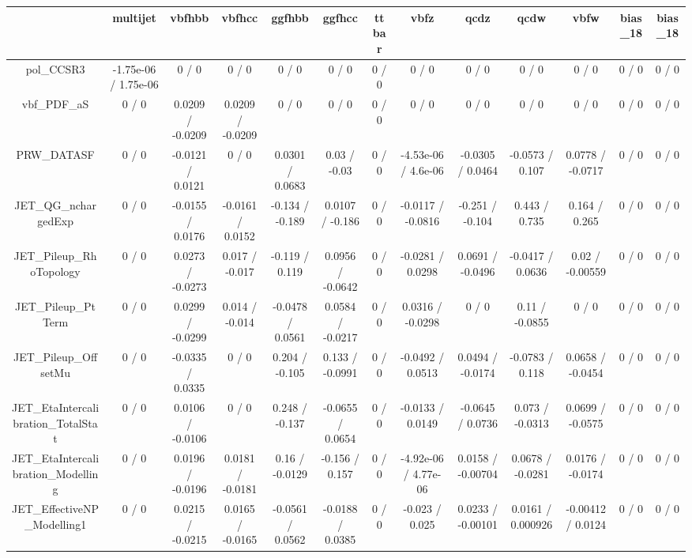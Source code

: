 \documentclass[10pt]{article}
\begin{document}
\begin{table}[htbp]
\begin{center}
\begin{tabular}{|c|c|c|c|c|c|c|c|c|c|c|c|c|}
\hline 
      & multijet      & vbfhbb      & vbfhcc      & ggfhbb      & ggfhcc      & ttbar      & vbfz      & qcdz      & qcdw      & vbfw      & bias_18      & bias_18 \\ 
\hline 
  pol_CCSR3 & -1.75e-06 / 1.75e-06 & 0 / 0 & 0 / 0 & 0 / 0 & 0 / 0 & 0 / 0 & 0 / 0 & 0 / 0 & 0 / 0 & 0 / 0 & 0 / 0 & 0 / 0 \\ 
  vbf_PDF_aS & 0 / 0 & 0.0209 / -0.0209 & 0.0209 / -0.0209 & 0 / 0 & 0 / 0 & 0 / 0 & 0 / 0 & 0 / 0 & 0 / 0 & 0 / 0 & 0 / 0 & 0 / 0 \\ 
  PRW_DATASF & 0 / 0 & -0.0121 / 0.0121 & 0 / 0 & 0.0301 / 0.0683 & 0.03 / -0.03 & 0 / 0 & -4.53e-06 / 4.6e-06 & -0.0305 / 0.0464 & -0.0573 / 0.107 & 0.0778 / -0.0717 & 0 / 0 & 0 / 0 \\ 
  JET_QG_nchargedExp & 0 / 0 & -0.0155 / 0.0176 & -0.0161 / 0.0152 & -0.134 / -0.189 & 0.0107 / -0.186 & 0 / 0 & -0.0117 / -0.0816 & -0.251 / -0.104 & 0.443 / 0.735 & 0.164 / 0.265 & 0 / 0 & 0 / 0 \\ 
  JET_Pileup_RhoTopology & 0 / 0 & 0.0273 / -0.0273 & 0.017 / -0.017 & -0.119 / 0.119 & 0.0956 / -0.0642 & 0 / 0 & -0.0281 / 0.0298 & 0.0691 / -0.0496 & -0.0417 / 0.0636 & 0.02 / -0.00559 & 0 / 0 & 0 / 0 \\ 
  JET_Pileup_PtTerm & 0 / 0 & 0.0299 / -0.0299 & 0.014 / -0.014 & -0.0478 / 0.0561 & 0.0584 / -0.0217 & 0 / 0 & 0.0316 / -0.0298 & 0 / 0 & 0.11 / -0.0855 & 0 / 0 & 0 / 0 & 0 / 0 \\ 
  JET_Pileup_OffsetMu & 0 / 0 & -0.0335 / 0.0335 & 0 / 0 & 0.204 / -0.105 & 0.133 / -0.0991 & 0 / 0 & -0.0492 / 0.0513 & 0.0494 / -0.0174 & -0.0783 / 0.118 & 0.0658 / -0.0454 & 0 / 0 & 0 / 0 \\ 
  JET_EtaIntercalibration_TotalStat & 0 / 0 & 0.0106 / -0.0106 & 0 / 0 & 0.248 / -0.137 & -0.0655 / 0.0654 & 0 / 0 & -0.0133 / 0.0149 & -0.0645 / 0.0736 & 0.073 / -0.0313 & 0.0699 / -0.0575 & 0 / 0 & 0 / 0 \\ 
  JET_EtaIntercalibration_Modelling & 0 / 0 & 0.0196 / -0.0196 & 0.0181 / -0.0181 & 0.16 / -0.0129 & -0.156 / 0.157 & 0 / 0 & -4.92e-06 / 4.77e-06 & 0.0158 / -0.00704 & 0.0678 / -0.0281 & 0.0176 / -0.0174 & 0 / 0 & 0 / 0 \\ 
  JET_EffectiveNP_Modelling1 & 0 / 0 & 0.0215 / -0.0215 & 0.0165 / -0.0165 & -0.0561 / 0.0562 & -0.0188 / 0.0385 & 0 / 0 & -0.023 / 0.025 & 0.0233 / -0.00101 & 0.0161 / 0.000926 & -0.00412 / 0.0124 & 0 / 0 & 0 / 0 \\ 

\end{tabular}
\end{center}
\end{table}
\end{document}
